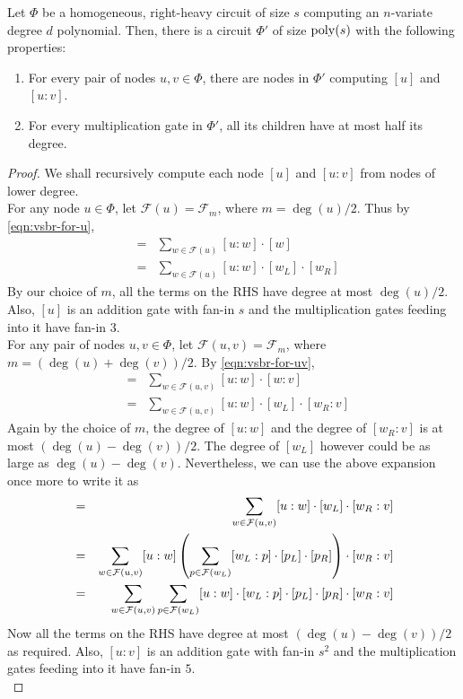 \begin{theorem}\label{thm:vsbr-with-structure}
Let $\Phi$ be a homogeneous, right-heavy circuit of size $s$ computing an $n$-variate degree $d$ polynomial. 
Then, there is a circuit $\Phi'$ of size $\operatorname{poly}(s)$ with the following properties:
\begin{enumerate}
\item For every pair of nodes  $u,v\in \Phi$, there are nodes in $\Phi'$ computing $[u]$ and $[u:v]$.
\item For every multiplication gate in $\Phi'$, all its children have at most half its degree. 
\end{enumerate}
\end{theorem}
\begin{proof}
  We shall recursively compute each node $[u]$ and $[u:v]$ from nodes of lower degree. \\

  \noindent
  For any node $u\in \Phi$, let $\mathcal{F}(u) = \mathcal{F}_m$, where
  $m = \deg(u)/2$. 
Thus by \eqref{eqn:vsbr-for-u},
  \begin{eqnarray*}
    [u] & = & \sum_{w\in \mathcal{F}(u)} [u:w] \cdot [w]\\ 
    & = & \sum_{w\in \mathcal{F}(u)} [u:w] \cdot [w_L] \cdot [w_R]
  \end{eqnarray*}
  By our choice of $m$, all the terms on the RHS have degree at most
  $\deg(u)/2$. 
Also, $[u]$ is an addition gate with fan-in $s$ and the
  multiplication gates feeding into it have fan-in $3$.\\
  
  \noindent
  For any pair of nodes $u,v\in \Phi$, let $\mathcal{F}(u,v) =
  \mathcal{F}_m$, where $m = (\deg(u) + \deg(v))/2$. 
By
  \eqref{eqn:vsbr-for-uv},
  \begin{eqnarray*}
    [u:v] & = & \sum_{w\in \mathcal{F}(u,v)} [u:w] \cdot [w:v]\\ 
    & = & \sum_{w\in \mathcal{F}(u,v)} [u:w] \cdot [w_L] \cdot [w_R:v]
  \end{eqnarray*}
  Again by the choice of $m$, the degree of $[u:w]$ and the degree of
  $[w_R:v]$ is at most $(\deg(u) - \deg(v))/2$. 
The degree of $[w_L]$
  however could be as large as $\deg(u) - \deg(v)$. 
Nevertheless, we can
  use the above expansion once more to write it as
  \begin{eqnarray*}
    [u:v] & = & \sum_{w\in \mathcal{F}(u,v)} [u:w] \cdot [w_L] \cdot [w_R:v]\\
    & = & \sum_{w\in \mathcal{F}(u,v)} [u:w] \inparen{\sum_{p \in \mathcal{F}(w_L)} [w_L:p] \cdot [p_L] \cdot [p_R]}\cdot [w_R:v]\\
    & = & \sum_{w\in \mathcal{F}(u,v)}\sum_{p\in \mathcal{F}(w_L)} [u:w] \cdot  [w_L:p] \cdot [p_L] \cdot [p_R]\cdot [w_R:v]
  \end{eqnarray*}
  Now all the terms on the RHS have degree at most $(\deg(u) -
  \deg(v))/2$ as required. 
Also, $[u:v]$ is an addition gate with fan-in
  $s^2$ and the multiplication gates feeding into it have fan-in $5$.\\
  

\end{proof}
